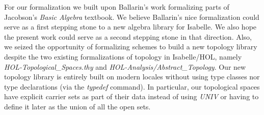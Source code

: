\documentclass[12pt]{scrartcl}
\begin{document}
For our formalization we built upon Ballarin's work \cite{ballarin20} formalizing parts of Jacobson's \textit{Basic Algebra} textbook. We believe Ballarin's nice formalization could serve as a first stepping stone to a new algebra library for Isabelle. We also hope the present work could serve as a second stepping stone in that direction. Also, we seized the opportunity of formalizing schemes to build a new topology library despite the two existing formalizations of topology in Isabelle/HOL, namely \textit{HOL-Topological\_Spaces.thy} and \textit{HOL-Analysis/Abstract\_Topology}. Our new topology library is entirely built on modern locales without using type classes nor type declarations (via the \textit{typedef} command). In particular, our topological spaces have explicit carrier sets as part of their data instead of using \textit{UNIV} or having to define it later as the union of all the open sets. 
\end{document}
